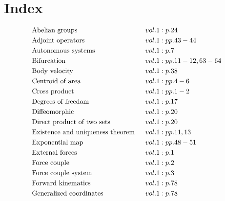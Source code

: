 \documentclass[a4paper]{article}
\begin{document}
 
\section*{Index} 
\allowdisplaybreaks 
\begin{align*} 
&\text{Abelian groups} \hspace*{0.55556em}&& vol. 1: p. 24\\
&\text{Adjoint operators} \hspace*{0.55556em}&& vol. 1: pp. 43-44\\
&\text{Autonomous systems} \hspace*{0.55556em}&& vol. 1: p. 7\\
&\text{Bifurcation} \hspace*{0.55556em}&& vol. 1: pp. 11-12, 63-64\\
&\text{Body velocity} \hspace*{0.55556em}&& vol. 1: p. 38\\
&\text{Centroid of area} \hspace*{0.55556em}&& vol. 1: pp. 4-6\\
&\text{Cross product} \hspace*{0.55556em}&& vol. 1: pp. 1-2\\
&\text{Degrees of freedom} \hspace*{0.55556em}&& vol. 1: p. 17\\
&\text{Diffeomorphic} \hspace*{0.55556em}&& vol. 1: p. 20\\
&\text{Direct product of two sets} \hspace*{0.55556em}&& vol. 1: p. 20\\
&\text{Existence and uniqueness theorem} \hspace*{0.55556em}&& vol. 1: pp. 11, 13\\
&\text{Exponential map} \hspace*{0.55556em}&& vol. 1: pp. 48-51\\
&\text{External forces} \hspace*{0.55556em}&& vol. 1: p. 1\\
&\text{Force couple} \hspace*{0.55556em}&& vol. 1: p. 2\\
&\text{Force couple system} \hspace*{0.55556em}&& vol. 1: p. 3\\
&\text{Forward kinematics} \hspace*{0.55556em}&& vol. 1: p. 78\\
&\text{Generalized coordinates} \hspace*{0.55556em}&& vol. 1: p. 78\\

\end{align*}
\end{document}
